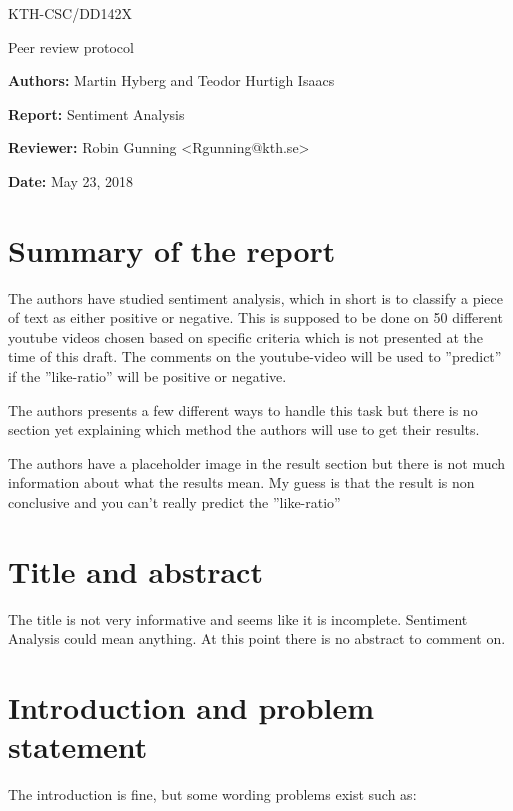 \documentclass[a4paper,12pt]{article}
\begin{document}
\noindent
\small KTH-CSC/DD142X

\begin{center}
\huge Peer review protocol
\end{center}

\noindent
\textbf{Authors:} Martin Hyberg and Teodor Hurtigh Isaacs


\noindent
\textbf{Report:} Sentiment Analysis

\noindent
\textbf{Reviewer:} Robin Gunning <Rgunning@kth.se>

\noindent
\textbf{Date:} May 23, 2018

\section{Summary of the report}
The authors have studied sentiment analysis, which in short is to classify a piece of text as either positive or negative. This is supposed to be done on 50 different youtube videos chosen based on specific criteria which is not presented at the time of this draft. 
The comments on the youtube-video will be used to ''predict'' if the ''like-ratio'' will be positive or negative. 

The authors presents a few different ways to handle this task but there is no section yet explaining which method the authors will use to get their results.


The authors have a placeholder image in the result section but there is not much information about what the results mean. My guess is that the result is non conclusive and you can't really predict the ''like-ratio''


\section{Title and abstract}
The title is not very informative and seems like it is incomplete. Sentiment Analysis could mean anything. At this point there is no abstract to comment on.



\section{Introduction and problem statement}
The introduction is fine, but some wording problems exist such as: 
\end{document}
